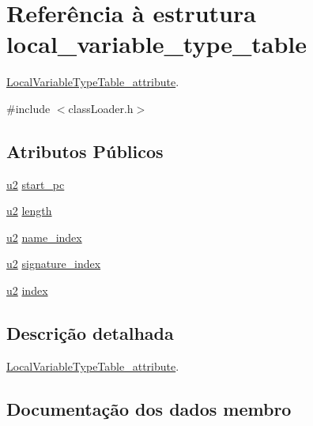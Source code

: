 \hypertarget{structlocal__variable__type__table}{}\section{Referência à estrutura local\+\_\+variable\+\_\+type\+\_\+table}
\label{structlocal__variable__type__table}


\hyperlink{struct_local_variable_type_table__attribute}{Local\+Variable\+Type\+Table\+\_\+attribute}.  




{\ttfamily \#include $<$class\+Loader.\+h$>$}

\subsection*{Atributos Públicos}
\begin{DoxyCompactItemize}
\item 
\hyperlink{util_8h_a55ef8d87fd202b8417704c089899c5b9}{u2} \hyperlink{structlocal__variable__type__table_ac103af911d6332aa10c82d84c8afa57c}{start\+\_\+pc}
\item 
\hyperlink{util_8h_a55ef8d87fd202b8417704c089899c5b9}{u2} \hyperlink{structlocal__variable__type__table_af46dbba25226ddc372f07e178bbb052b}{length}
\item 
\hyperlink{util_8h_a55ef8d87fd202b8417704c089899c5b9}{u2} \hyperlink{structlocal__variable__type__table_a1dee07ad0be4c2e48de203079c794938}{name\+\_\+index}
\item 
\hyperlink{util_8h_a55ef8d87fd202b8417704c089899c5b9}{u2} \hyperlink{structlocal__variable__type__table_ac9769207096102e63af9453fb6f82019}{signature\+\_\+index}
\item 
\hyperlink{util_8h_a55ef8d87fd202b8417704c089899c5b9}{u2} \hyperlink{structlocal__variable__type__table_a3c0c5a2a40e24a80d357a116afb8cd2a}{index}
\end{DoxyCompactItemize}


\subsection{Descrição detalhada}
\hyperlink{struct_local_variable_type_table__attribute}{Local\+Variable\+Type\+Table\+\_\+attribute}. 

\subsection{Documentação dos dados membro}
\mbox{\label{structlocal__variable__type__table_a3c0c5a2a40e24a80d357a116afb8cd2a}} 
